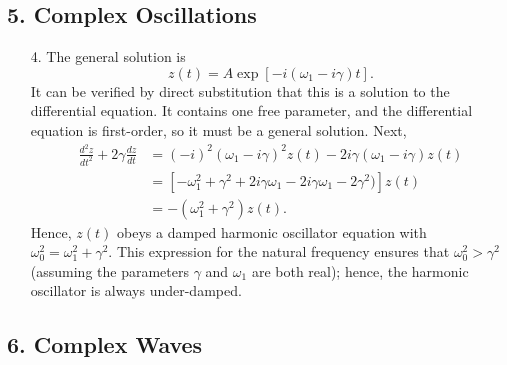 \documentclass[10pt,a4paper]{article}
\begin{document}
\subsection*{5. Complex Oscillations}

\begin{enumerate}
\item[4.]
The general solution is
\begin{equation}
  z(t) = A \exp\left[-i(\omega_1 - i \gamma) t\right].
\end{equation}
It can be verified by direct substitution that this is a solution to
the differential equation. It contains one free parameter, and the
differential equation is first-order, so it must be a general
solution.  Next,
\begin{align}
  \frac{d^2z}{dt^2} + 2 \gamma \frac{dz}{dt} &= (-i)^2(\omega_1 - i\gamma)^2 z(t) - 2i \gamma (\omega_1 - i \gamma) z(t) \\
  &= \left[- \omega_1^2 + \gamma^2 + 2i\gamma\omega_1 - 2i \gamma \omega_1 - 2\gamma^2)\right] z(t) \\
  &= -\left(\omega_1^2 + \gamma^2\right)z(t).
\end{align}
Hence, $z(t)$ obeys a damped harmonic oscillator equation with
$\omega_0^2 = \omega_1^2 + \gamma^2.$ This expression for the natural
frequency ensures that $\omega_0^2 > \gamma^2$ (assuming the
parameters $\gamma$ and $\omega_1$ are both real); hence, the
harmonic oscillator is always under-damped.
\end{enumerate}

\subsection*{6. Complex Waves}
\end{document}

